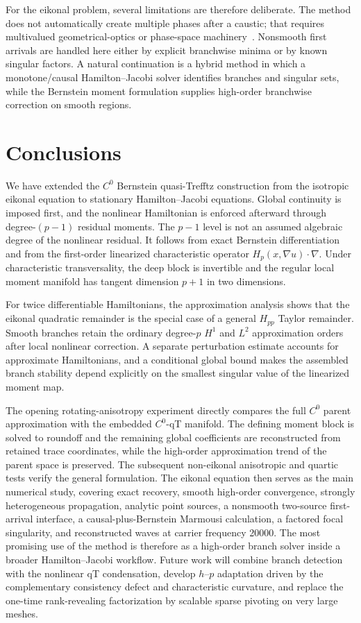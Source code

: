 \documentclass[preprint,12pt]{elsarticle}
\newcommand{\grad}{\nabla}
\begin{document}
For the eikonal problem, several limitations are therefore deliberate.  The method does not automatically create multiple phases after a caustic; that requires multivalued geometrical-optics or phase-space machinery~\cite{QianLeung2004,Runborg2007}.  Nonsmooth first arrivals are handled here either by explicit branchwise minima or by known singular factors.  A natural continuation is a hybrid method in which a monotone/causal Hamilton--Jacobi solver identifies branches and singular sets, while the Bernstein moment formulation supplies high-order branchwise correction on smooth regions.

\section{Conclusions}
We have extended the $C^0$ Bernstein quasi-Trefftz construction from the isotropic eikonal equation to stationary Hamilton--Jacobi equations.  Global continuity is imposed first, and the nonlinear Hamiltonian is enforced afterward through degree-$(p-1)$ residual moments.  The $p-1$ level is not an assumed algebraic degree of the nonlinear residual.  It follows from exact Bernstein differentiation and from the first-order linearized characteristic operator $H_p(x,\grad u)\cdot\grad$.  Under characteristic transversality, the deep block is invertible and the regular local moment manifold has tangent dimension $p+1$ in two dimensions.

For twice differentiable Hamiltonians, the approximation analysis shows that the eikonal quadratic remainder is the special case of a general $H_{pp}$ Taylor remainder.  Smooth branches retain the ordinary degree-$p$ $H^1$ and $L^2$ approximation orders after local nonlinear correction.  A separate perturbation estimate accounts for approximate Hamiltonians, and a conditional global bound makes the assembled branch stability depend explicitly on the smallest singular value of the linearized moment map.

The opening rotating-anisotropy experiment directly compares the full $C^0$ parent approximation with the embedded $C^0$-qT manifold.  The defining moment block is solved to roundoff and the remaining global coefficients are reconstructed from retained trace coordinates, while the high-order approximation trend of the parent space is preserved.  The subsequent non-eikonal anisotropic and quartic tests verify the general formulation.  The eikonal equation then serves as the main numerical study, covering exact recovery, smooth high-order convergence, strongly heterogeneous propagation, analytic point sources, a nonsmooth two-source first-arrival interface, a causal-plus-Bernstein Marmousi calculation, a factored focal singularity, and reconstructed waves at carrier frequency 20000.  The most promising use of the method is therefore as a high-order branch solver inside a broader Hamilton--Jacobi workflow.  Future work will combine branch detection with the nonlinear qT condensation, develop $h$--$p$ adaptation driven by the complementary consistency defect and characteristic curvature, and replace the one-time rank-revealing factorization by scalable sparse pivoting on very large meshes.
\end{document}
